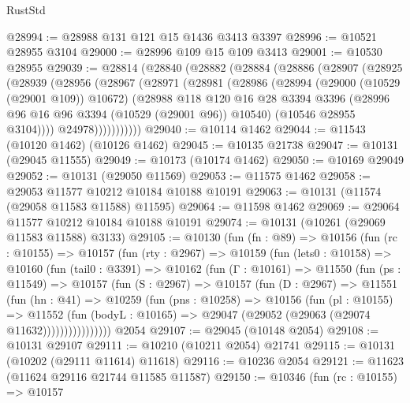 \begin{lexlean}{RustStd}
\begin{coremodule}
@28994 := @28988 @131 @121 @15 @1436 @3413 @3397
@28996 := @10521 @28955 @3104
@29000 := @28996 @109 @15 @109 @3413
@29001 := @10530 @28955
@29039 := @28814
    (@28840
      (@28882
        (@28884
          (@28886
            (@28907
              (@28925
                (@28939
                  (@28956
                    (@28967
                      (@28971
                        (@28981
                          (@28986
                            (@28994
                              (@29000 (@10529 (@29001 @109)) @10672)
                              (@28988
                                @118
                                @120
                                @16
                                @28
                                @3394
                                @3396
                                (@28996 @96 @16 @96 @3394 (@10529 (@29001 @96)) @10540)
                                (@10546 @28955 @3104))))
                          @24978)))))))))))
@29040 := @10114 @1462
@29044 := @11543 (@10120 @1462) (@10126 @1462)
@29045 := @10135 @21738
@29047 := @10131 (@29045 @11555)
@29049 := @10173 (@10174 @1462)
@29050 := @10169 @29049
@29052 := @10131 (@29050 @11569)
@29053 := @11575 @1462
@29058 := @29053 @11577 @10212 @10184 @10188 @10191
@29063 := @10131 (@11574 (@29058 @11583 @11588) @11595)
@29064 := @11598 @1462
@29069 := @29064 @11577 @10212 @10184 @10188 @10191
@29074 := @10131 (@10261 (@29069 @11583 @11588) @3133)
@29105 := @10130
    (fun (fn : @89) =>
    @10156
      (fun (rc : @10155) =>
      @10157
        (fun (rty : @2967) =>
        @10159
          (fun (lets0 : @10158) =>
          @10160
            (fun (tail0 : @3391) =>
            @10162
              (fun (Γ : @10161) =>
              @11550
                (fun (ps : @11549) =>
                @10157
                  (fun (S : @2967) =>
                  @10157
                    (fun (D : @2967) =>
                    @11551
                      (fun (hn : @41) =>
                      @10259
                        (fun (pns : @10258) =>
                        @10156
                          (fun (pl : @10155) =>
                          @11552
                            (fun (bodyL : @10165) =>
                            @29047 (@29052 (@29063 (@29074 @11632))))))))))))))))
    @2054
@29107 := @29045 (@10148 @2054)
@29108 := @10131 @29107
@29111 := @10210 (@10211 @2054) @21741
@29115 := @10131 (@10202 (@29111 @11614) @11618)
@29116 := @10236 @2054
@29121 := @11623 (@11624 @29116 @21744 @11585 @11587)
@29150 := @10346
    (fun (rc : @10155) =>
    @10157

\end{coremodule}
\end{lexlean}
